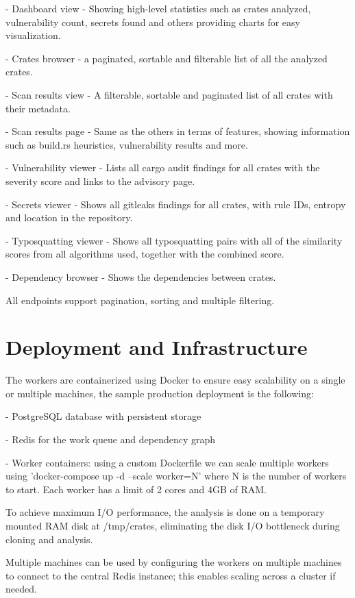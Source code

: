 - Dashboard view - Showing high-level statistics such as crates analyzed, vulnerability count, secrets found and others providing charts for easy visualization.

- Crates browser - a paginated, sortable and filterable list of all the analyzed crates.

- Scan results view - A filterable, sortable and paginated list of all crates with their metadata.

- Scan results page - Same as the others in terms of features, showing information such as build.rs heuristics, vulnerability results and more.

- Vulnerability viewer - Lists all cargo audit findings for all crates with the severity score and links to the advisory page.

- Secrets viewer - Shows all gitleaks findings for all crates, with rule IDs, entropy and location in the repository.

- Typosquatting viewer - Shows all typosquatting pairs with all of the similarity scores from all algorithms used, together with the combined score.

- Dependency browser - Shows the dependencies between crates.

All endpoints support pagination, sorting and multiple filtering.

\section{Deployment and Infrastructure}\label{sect:deployment}

The workers are containerized using Docker to ensure easy scalability on a single or multiple machines, the sample production deployment is the following:

- PostgreSQL database with persistent storage

- Redis for the work queue and dependency graph

- Worker containers: using a custom Dockerfile we can scale multiple workers using 'docker-compose up -d --scale worker=N' where N is the number of workers to start. Each worker has a limit of 2 cores and 4GB of RAM.

To achieve maximum I/O performance, the analysis is done on a temporary mounted RAM disk at /tmp/crates, eliminating the disk I/O bottleneck during cloning and analysis.

Multiple machines can be used by configuring the workers on multiple machines to connect to the central Redis instance; this enables scaling across a cluster if needed.
